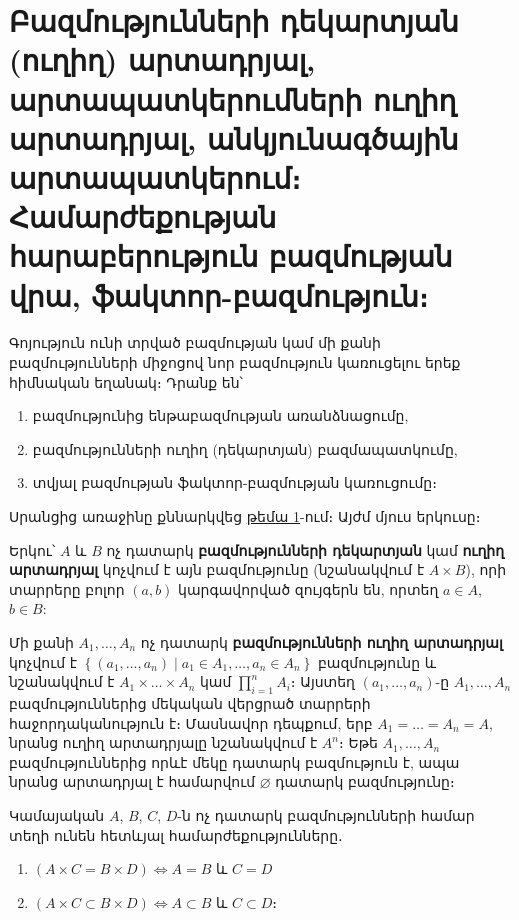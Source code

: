 \documentclass[./main.tex]{subfiles}
\begin{document}
\onehalfspacing
\section{Բազմությունների դեկարտյան (ուղիղ) արտա\-դրյալ, արտա\-պատ\-կե\-րում\-ների ուղիղ արտա\-դրյալ, ան\-կյու\-նա\-գծա\-յին արտա\-պատ\-կե\-րում։ Համ\-ար\-ժե\-քութ\-յան հարա\-բերու\-թյուն բազ\-մու\-թյան վրա, ֆակտոր-բազմու\-թ\-յուն։}\label{sec:2}

Գոյություն ունի տրված բազմության կամ մի քանի բազմությունների միջոցով նոր բազ\-մու\-թյուն կառուցելու
երեք հիմնական եղանակ։ Դրանք են՝
\begin{enumerate}
    \item [ա)] բազմությունից ենթաբազմության առանձնացումը,
    \item [բ)] բազմությունների ուղիղ (դեկարտյան) բազմապատկումը,
    \item [գ)] տվյալ բազմության ֆակտոր-բազմության կառուցումը։
\end{enumerate}
\par Սրանցից առաջինը քննարկվեց \hyperref[sec:1]{թեմա 1}-ում։ Այժմ մյուս երկուսը։ 
\par Երկու՝ $A$ և $B$ ոչ դատարկ \textbf{բազմությունների դեկարտյան} կամ \textbf{ուղիղ արտա\-դր\-յալ} կոչվում է այն բազմությունը (նշանակվում է $A \times B$), որի տարրերը բոլոր $(a,b)$ կարգավորված զույգերն են, որտեղ $a\in A$, $b \in B$: 
\par Մի քանի $A_1,\dots,A_n$ ոչ դատարկ \textbf{բազմությունների ուղիղ արտադրյալ} կոչվում է $\left\{(a_1,\dots, a_n)\mid a_1\in A_1,\dots, a_n \in A_n\right\}$ բազմությունը և նշանակվում է $A_1\times \dots \times A_n$ կամ $\prod\limits_{i=1}^n A_i$։ Այստեղ $(a_1, \dots, a_n)$-ը $A_1,\dots, A_n$ բազմություններից մեկական վերցրած տարրերի հաջորդականություն է։ Մասնավոր դեպքում, երբ $A_1=\dots=A_n=A$, նրանց ուղիղ արտադրյալը նշանակվում է $A^n$։ Եթե $A_1,\dots, A_n$ բազմություններից որևէ մեկը դատարկ բազմություն է, ապա նրանց արտադրյալ է համարվում $\varnothing$ դատարկ բազմությունը։ 
\begin{theorem}\label{ch2thm1}
 Կամայական $A$, $B$, $C$, $D$-ն ոչ դատարկ բազմութ\-յուն\-ների համար տեղի ունեն հետևյալ համարժեքությունները․
\begin{enumerate}
    \item [ա)] $(A\times C=B\times D)\Leftrightarrow A=B$ և $C=D$
    \item [բ)] $(A\times C\subset B\times D)\Leftrightarrow A\subset B$ և $C\subset D$։
\end{enumerate}
\end{theorem}
\end{document}
